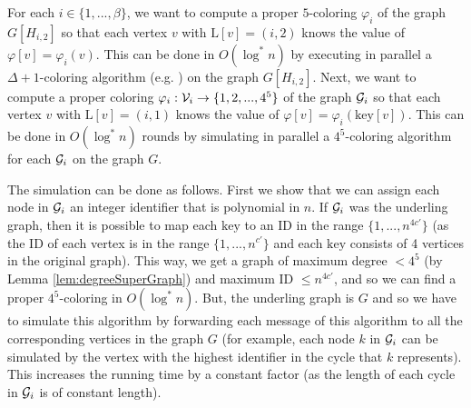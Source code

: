 \documentclass{article}
\theoremstyle{definition}
\def\shiri#1{\textcolor{red}{[Shiri: #1]}}
\begin{document}
For each $i \in \{1, ..., \beta\}$, we want to compute a proper $5$-coloring $\varphi_{i}$ of the graph $G[H_{i,2}]$ so that each vertex $v$ with $\text{L}[v] = (i,2)$ knows the value of $\varphi[v] = \varphi_{i}(v)$. This can be done in $O(\log^{*}n)$ by executing in parallel a $\Delta+1$-coloring algorithm (e.g. \cite{Goldberg87}) on the graph $G[H_{i,2}]$. Next, we want to compute a proper coloring $\varphi_{i}:{\cal V}_{i} \to \{1,2,...,4^5\}$ of the graph ${\cal G}_{i}$ so that each vertex $v$ with $\text{L}[v] = (i,1)$ knows the value of $\varphi[v] = \varphi_{i}(\text{key}[v])$. This can be done in $O(\log^{*}n)$ rounds by simulating in parallel a $4^5$-coloring algorithm for each ${\cal G}_{i}$ on the graph $G$.\medskip

The simulation can be done as follows.
First we show that we can assign each node in ${\cal G}_{i}$ an integer identifier that is polynomial in $n$.
If ${\cal G}_{i}$ was the underling graph, then it is possible to map each $\text{key}$ to an ID in the range $\{1,...,n^{4c'}\}$ (as the ID of each vertex is in the range $\{1,...,n^{c'}\}$ and each $\text{key}$ consists of 4 vertices in the original graph).
This way, we get a graph of maximum degree $< 4^5$ (by Lemma \ref{lem:degreeSuperGraph}) and maximum ID $\le n^{4c'}$, and so we can find a proper $4^5$-coloring in $O(\log^*{n})$. But, the underling graph is $G$ and so we have to simulate this algorithm by forwarding each message of this algorithm to all the corresponding vertices in the graph $G$ (for example, each node $k$  in ${\cal G}_{i}$ can be simulated by the vertex with the highest identifier in the cycle that $k$  represents). This increases the running time by a constant factor (as the length of each cycle in ${\cal G}_{i}$ is of constant length).

%
%
\end{document}
